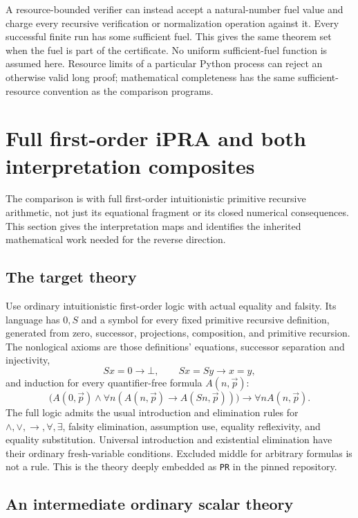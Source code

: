 \documentclass[11pt,letterpaper]{article}
\theoremstyle{definition}
\begin{document}
A resource-bounded verifier can instead accept a natural-number fuel value
and charge every recursive verification or normalization operation against
it.  Every successful finite run has some sufficient fuel.  This gives the
same theorem set when the fuel is part of the certificate.  No uniform
sufficient-fuel function is assumed here.  Resource limits of a particular
Python process can reject an otherwise valid long proof; mathematical
completeness has the same sufficient-resource convention as the comparison
programs.


\section{Full first-order iPRA and both interpretation composites}
\label{sec:interpretations}

The comparison is with full first-order intuitionistic primitive recursive
arithmetic, not just its equational fragment or its closed numerical
consequences.  This section gives the interpretation maps and identifies
the inherited mathematical work needed for the reverse direction.

\subsection{The target theory}

Use ordinary intuitionistic first-order logic with actual equality and
falsity.  Its language has $0,S$ and a symbol for every fixed primitive
recursive definition, generated from zero, successor, projections,
composition, and primitive recursion.  The nonlogical axioms are those
definitions' equations, successor separation and injectivity,
\[
   Sx=0\to\bot,\qquad Sx=Sy\to x=y,
\]
and induction for every quantifier-free formula $A(n,\vec p)$:
\[
 \bigl(A(0,\vec p)\wedge
       \forall n(A(n,\vec p)\to A(Sn,\vec p))\bigr)
       \to\forall n A(n,\vec p).
\]
The full logic admits the usual introduction and elimination rules for
$\wedge,\vee,\to,\forall,\exists$, falsity elimination, assumption use,
equality reflexivity, and equality substitution.  Universal introduction
and existential elimination have their ordinary fresh-variable conditions.
Excluded middle for arbitrary formulas is not a rule.  This is the theory
deeply embedded as \texttt{PR} in the pinned repository.

\subsection{An intermediate ordinary scalar theory}
\end{document}
